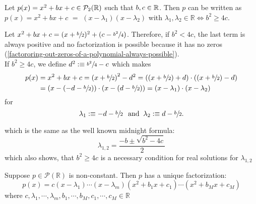\begin{thm} 
  \label{thm: factorization of a quadratic polynomial}
  Let $p(x)=x^2+bx+c \in \mathcal{P}_2(\mathbb{R})$ such that $b,c \in \mathbb{R}$. Then $p$ can be written as
  $p(x)=x^2 + bx + c$ $=$ $(x-\lambda_1)(x-\lambda_2)$ with $\lambda_1, \lambda_2 \in \mathbb{R} \iff b^2 \geq 4c$.
\end{thm}
\begin{prf}
  Let $x^2+bx+c=(x+\sfrac{b}{2})^2+(c-\sfrac{b^2}{4})$. Therefore, if $b^2<4c$, the last term is always positive and no factoriza\-tion is possible because it has no zeros (\ref{factororing-out-zeros-of-a-polynomial-always-possible}). \\
  If $b^2 \geq 4c$, we define $d^2 :\equiv \sfrac{b^2}{4}-c$ which makes
  \begin{equation}
	  \begin{aligned}
	    p(x)&=x^2+bx+c
		  = \left (x+\sfrac{b}{2} \right )^2-d^2
		  = \left ( (x+\sfrac{b}{2}) +d \right) \cdot \left ( (x+\sfrac{b}{2}) - d \right) \\
		  &= \left (x-(-d -\sfrac{b}{2}) \right) \cdot \left (x-(d-\sfrac{b}{2})\right)
		  =\left(x-\lambda_1 \right) \cdot \left(x-\lambda_2\right)
	  \end{aligned}
  \end{equation}
  for 
  \begin{equation}
    \lambda_1 :\equiv -d-\sfrac{b}{2} \;\;\, \text{and}\;\; \lambda_2 :\equiv d-\sfrac{b}{2}.
  \end{equation}
  
  which is the same as the well known midnight formula:
  \begin{equation}
    \lambda_{1,2} = \frac{-b \pm \sqrt{b^2-4c}}{2}
  \end{equation}
  which also shows, that $b^2 \geq 4c$ is a necessary condition for real solutions for $\lambda_{1,2}$
\end{prf}

\begin{thm}
  Suppose $p \in \mathcal{P}(\mathbb{R})$ is non-constant. Then $p$ has a unique factorization:
  \begin{equation}
    p(x) = c(x-\lambda_1) \cdots (x-\lambda_m)(x^2+b_1x+c_1) \cdots (x^2+b_Mx+c_M)
  \end{equation}
  where $c, \lambda_1, \cdots, \lambda_m, b_1, \cdots, b_M, c_1, \cdots, c_M \in \mathbb{R}$
\end{thm}

